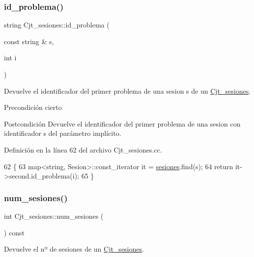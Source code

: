 \subsubsection{\texorpdfstring{id\+\_\+problema()}{id\_problema()}}
{\footnotesize\ttfamily string Cjt\+\_\+sesiones\+::id\+\_\+problema (\begin{DoxyParamCaption}\item[{const string \&}]{s,  }\item[{int}]{i }\end{DoxyParamCaption})}



Devuelve el identificador del primer problema de una sesion s de un \mbox{\hyperlink{class_cjt__sesiones}{Cjt\+\_\+sesiones}}. 

\begin{DoxyPrecond}{Precondición}
cierto 
\end{DoxyPrecond}
\begin{DoxyPostcond}{Postcondición}
Devuelve el identificador del primer problema de una sesion con identificador s del parámetro implícito. 
\end{DoxyPostcond}


Definición en la línea 62 del archivo Cjt\+\_\+sesiones.\+cc.


\begin{DoxyCode}
62                                                            \{
63       map<string, Sesion>::const\_iterator it = \mbox{\hyperlink{class_cjt__sesiones_a87e835a62e561eeb0f93eedbdcbe1802}{sesiones}}.find(s);
64       \textcolor{keywordflow}{return} it->second.id\_problema(i);
65     \}
\end{DoxyCode}
\mbox{\label{class_cjt__sesiones_afd0955b255bea0e7e8f9a7be5156e5fc}} 
\subsubsection{\texorpdfstring{num\+\_\+sesiones()}{num\_sesiones()}}
{\footnotesize\ttfamily int Cjt\+\_\+sesiones\+::num\+\_\+sesiones (\begin{DoxyParamCaption}{ }\end{DoxyParamCaption}) const}



Devuelve el nº de sesiones de un \mbox{\hyperlink{class_cjt__sesiones}{Cjt\+\_\+sesiones}}. 

